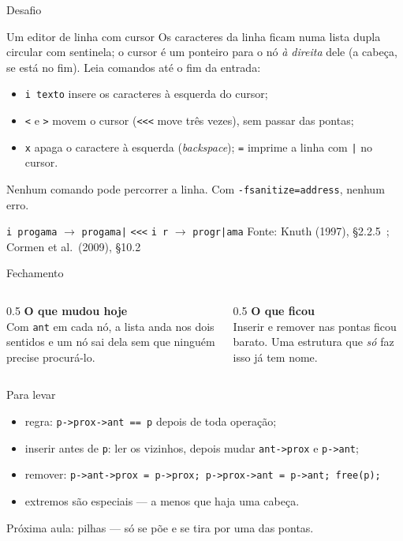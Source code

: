 \documentclass[aspectratio=169]{beamer}
\newcommand{\fonte}[1]{\vfill\hfill{\scriptsize\textcolor{UFSGray}{Fonte: #1}}}
\begin{document}
\begin{frame}[fragile]{Desafio}
  \begin{block}{Um editor de linha com cursor}
    \small Os caracteres da linha ficam numa lista dupla circular com
    sentinela; o cursor é um ponteiro para o nó \emph{à direita} dele (a
    cabeça, se está no fim). Leia comandos até o fim da entrada:
    \vspace{-0.3em}
    \begin{itemize}
      \item \texttt{i texto} insere os caracteres à esquerda do cursor;
      \item \texttt{<} e \texttt{>} movem o cursor (\texttt{<{}<{}<} move três
        vezes), sem passar das pontas;
      \item \texttt{x} apaga o caractere à esquerda (\emph{backspace});
        \texttt{=} imprime a linha com \texttt{|} no cursor.
    \end{itemize}
    \vspace{-0.3em}
    Nenhum comando pode percorrer a linha. Com \texttt{-fsanitize=address},
    nenhum erro.
  \end{block}
  \vspace{-0.3em}
  \centering\scriptsize
  \texttt{i progama} $\to$ \texttt{progama|} \quad
  \texttt{<{}<{}<} \quad \texttt{i r} $\to$ \texttt{progr|ama}
  \fonte{Knuth (1997), §2.2.5~\cite{knuth1997art};
    Cormen et al.\ (2009), §10.2~\cite{cormen2009introduction}}
\end{frame}

\begin{frame}{Fechamento}
  \begin{columns}[T]
    \begin{column}{0.5\textwidth}
      \textbf{O que mudou hoje}\\[0.3em]
      \small Com \texttt{ant} em cada nó, a lista anda nos dois sentidos e
      um nó sai dela sem que ninguém precise procurá-lo.
    \end{column}
    \begin{column}{0.5\textwidth}
      \textbf{O que ficou}\\[0.3em]
      \small Inserir e remover nas pontas ficou barato. Uma estrutura que
      \emph{só} faz isso já tem nome.
    \end{column}
  \end{columns}
  \begin{block}{Para levar}
    \begin{itemize}
      \small
      \item regra: \texttt{p->prox->ant == p} depois de toda operação;
      \item inserir antes de \texttt{p}: ler os vizinhos, depois mudar
        \texttt{ant->prox} e \texttt{p->ant};
      \item remover: \texttt{p->ant->prox = p->prox; p->prox->ant =
        p->ant; free(p);}
      \item extremos são especiais --- a menos que haja uma cabeça.
    \end{itemize}
  \end{block}
  \small\textcolor{UFSGray}{Próxima aula: pilhas --- só se põe e se tira
  por uma das pontas.}
\end{frame}
\end{document}
